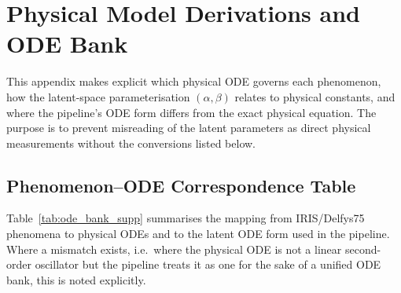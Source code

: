 \documentclass[runningheads]{llncs}
\begin{document}
\section{Physical Model Derivations and ODE Bank}
\label{app:ode_bank}

This appendix makes explicit which physical ODE governs each phenomenon,
how the latent-space parameterisation $(\alpha, \beta)$ relates to physical
constants, and where the pipeline's ODE form differs from the exact physical
equation. The purpose is to prevent misreading of the latent parameters as
direct physical measurements without the conversions listed below.

\subsection{Phenomenon–ODE Correspondence Table}
\label{app:ode_table}

Table~\ref{tab:ode_bank_supp} summarises the mapping from IRIS/Delfys75
phenomena to physical ODEs and to the latent ODE form used in the pipeline.
Where a mismatch exists, i.e.\ where the physical ODE is not a linear
second-order oscillator but the pipeline treats it as one for the sake of
a unified ODE bank, this is noted explicitly.
\end{document}
